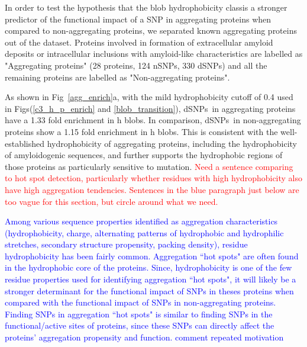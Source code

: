 \documentclass[10pt,letterpaper]{article}
\newcommand{\dSNPs}{dSNPs~}
\newcommand{\nSNPs}{nSNPs~}
\newcommand{\hydrochar}{hydrophobicity class}
\newcommand{\grace}[1]{\textcolor{red}{#1}}
\newcommand{\ruchi}[1]{\textcolor{blue}{#1}}
\begin{document}

In order to test the hypothesis that the blob \hydrochar is a stronger predictor of the functional impact of a SNP in aggregating proteins when compared to non-aggregating proteins, we separated known aggregating proteins out of the dataset. Proteins involved in formation of extracellular amyloid deposits or intracellular inclusions with amyloid-like characteristics are labelled as "Aggregating proteins" (28 proteins, 124 nSNPs, 330 dSNPs) and all the remaining proteins are labelled as "Non-aggregating proteins". 

As shown in Fig~\ref{agg_enrich}a, with the mild hydrophobicity cutoff of 0.4 used in Figs(\ref{c3_h_p_enrich} and \ref{blob_transition}), \dSNPs in aggregating proteins have a 1.33 fold enrichment in h blobs. In comparison, \dSNPs in non-aggregating proteins show a 1.15 fold enrichment in h blobs. This is consistent with the well-established hydrophobicity of aggregating proteins, including the hydrophobicity of amyloidogenic sequences\cite{Tzotzos2010,Abskharon2019}, and further supports the hydrophobic regions of those proteins as particularly sensitive to mutation. \grace{Need a sentence comparing to hot spot detection, particularly whether residues with high hydrophobicity also have high aggregation tendencies. Sentences in the blue paragraph just below are too vague for this section, but circle around what we need.}  

\ruchi{Among various sequence properties identified as aggregation characteristics (hydrophobicity, charge, alternating patterns of hydrophobic and hydrophilic stretches, secondary structure propensity, packing density), residue hydrophobicity has been fairly common. Aggregation ``hot spots" are often found in the hydrophobic core of the proteins.  Since, hydrophobicity is one of the few residue properties used for identifying aggregation ``hot spots", it will likely be a stronger determinant for the functional impact of SNPs in theses proteins when compared with the functional impact of SNPs in non-aggregating proteins. Finding SNPs in aggregation ``hot spots" is similar to finding SNPs in the functional/active sites of proteins, since these SNPs can directly affect the proteins' aggregation propensity and function. comment repeated motivation } 
\end{document}
